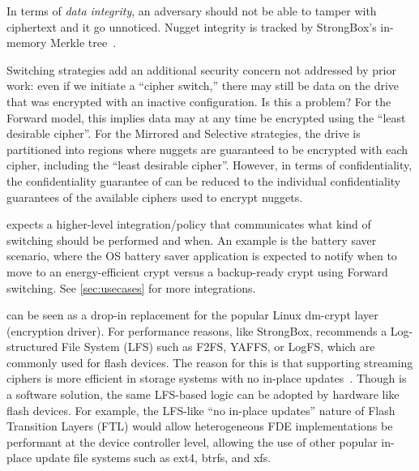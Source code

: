 In terms of {\em data integrity}, an adversary should not be able to tamper with
ciphertext and it go unnoticed. Nugget integrity is tracked by StrongBox's
in-memory Merkle tree~\cite{StrongBox}.

Switching strategies add an additional security concern not addressed by prior
work: even if we initiate a ``cipher switch,'' there may still be data on the
drive that was encrypted with an inactive configuration. Is this a problem? For
the Forward model, this implies data may at any time be encrypted using the
``least desirable cipher''. For the Mirrored and Selective strategies, the drive
is partitioned into regions where nuggets are guaranteed to be encrypted with
each cipher, including the ``least desirable cipher''. However, in terms of
confidentiality, the confidentiality guarantee of \sys can be reduced to the
individual confidentiality guarantees of the available ciphers used to encrypt
nuggets.

 \sys expects a higher-level integration/policy
that communicates what kind of switching should be performed and when. An
example is the battery saver scenario, where the OS battery saver application is
expected to notify \sys when to move to an energy-efficient crypt versus a
backup-ready crypt using Forward switching. See \cref*{sec:usecases} for more
integrations.

 \sys can be seen as a drop-in replacement for the popular
Linux dm-crypt layer (encryption driver). For performance reasons, like
StrongBox, \sys recommends a Log-structured File System (LFS) such as F2FS,
YAFFS, or LogFS, which are commonly used for flash devices. The reason for this
is that supporting streaming ciphers is more efficient in storage systems with
no in-place updates~\cite{StrongBox}. Though \sys is a software solution, the
same LFS-based logic can be adopted by hardware like flash devices. For example,
the LFS-like ``no in-place updates'' nature of Flash Transition Layers (FTL)
would allow heterogeneous FDE implementations be performant at the device
controller level, allowing the use of other popular in-place update file systems
such as ext4, btrfs, and xfs.
